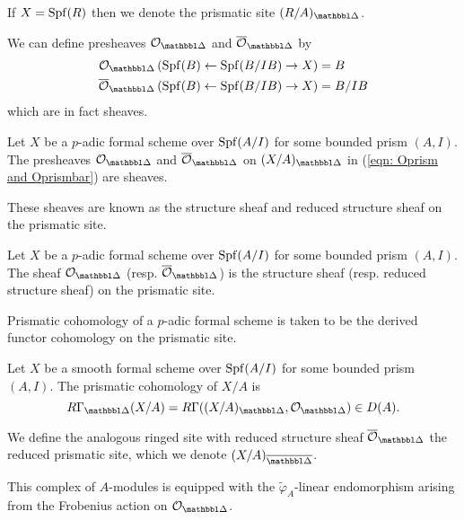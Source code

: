 \begin{remark}
    If $X=\mathrm{Spf}(R)$ then we denote the prismatic site $(R/A)_{\prism}$. 
\end{remark}
We can define presheaves $\Ocal_{\prism}$ and $\overline{\Ocal}_{\prism}$ by  
\begin{equation}\label{eqn: Oprism and Oprismbar}
    \begin{aligned}
        \Ocal_{\prism}\left(\spf(B)\leftarrow \spf(B/IB)\to X\right) &= B\\
        \overline{\Ocal}_{\prism}\left(\spf(B)\leftarrow \spf(B/IB)\to X\right) &= B/IB\\
    \end{aligned}
\end{equation}
which are in fact sheaves. 
\begin{proposition}\label{prop: Oprism and Oprismbar are sheaves}
    Let $X$ be a $p$-adic formal scheme over $\mathrm{Spf}(A/I)$ for some bounded prism $(A,I)$. The presheaves $\Ocal_{\prism}$ and $\overline{\Ocal}_{\prism}$ on $(X/A)_{\prism}$ in (\ref{eqn: Oprism and Oprismbar}) are sheaves. 
\end{proposition}
These sheaves are known as the structure sheaf and reduced structure sheaf on the prismatic site. 
\begin{definition}\label{def: structure sheaves on the prismatic stite}
    Let $X$ be a $p$-adic formal scheme over $\mathrm{Spf}(A/I)$ for some bounded prism $(A,I)$. The sheaf $\Ocal_{\prism}$ (resp. $\overline{\Ocal}_{\prism}$) is the structure sheaf (resp. reduced structure sheaf) on the prismatic site. 
\end{definition}
Prismatic cohomology of a $p$-adic formal scheme is taken to be the derived functor cohomology on the prismatic site. 
\begin{definition}\label{def: prismatic cohomology}
    Let $X$ be a smooth formal scheme over $\mathrm{Spf}(A/I)$ for some bounded prism $(A, I)$. The prismatic cohomology of $X/A$ is 
    $$R\Gamma_{\prism}(X/A)=R\Gamma((X/A)_{\prism},\Ocal_{\prism})\in D(A).$$
\end{definition}
\begin{remark}
    We define the analogous ringed site with reduced structure sheaf $\overline{\Ocal}_{\prism}$ the reduced prismatic site, which we denote $(X/A)_{\overline{\prism}}$.
\end{remark}
\begin{remark}
    This complex of $A$-modules is equipped with the $\widetilde{\varphi}_{A}$-linear endomorphism arising from the Frobenius action on $\Ocal_{\prism}$. 
\end{remark}